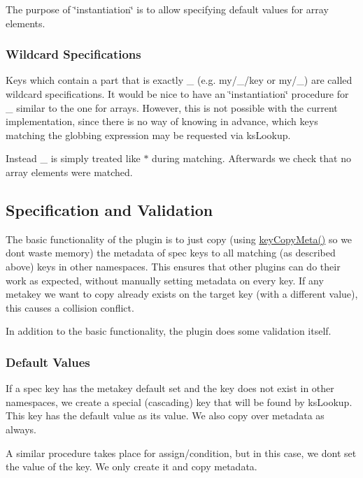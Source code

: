 The purpose of \char`\"{}instantiation\char`\"{} is to allow specifying {\ttfamily default} values for array elements.

\subsubsection*{Wildcard Specifications}

Keys which contain a part that is exactly {\ttfamily \+\_\+} (e.\+g. {\ttfamily my/\+\_\+/key} or {\ttfamily my/\+\_\+}) are called wildcard specifications. It would be nice to have an \char`\"{}instantiation\char`\"{} procedure for {\ttfamily \+\_\+} similar to the one for arrays. However, this is not possible with the current implementation, since there is no way of knowing in advance, which keys matching the globbing expression may be requested via {\ttfamily ks\+Lookup}.

Instead {\ttfamily \+\_\+} is simply treated like {\ttfamily $\ast$} during matching. Afterwards we check that no array elements were matched.

\subsection*{Specification and Validation}

The basic functionality of the plugin is to just copy (using {\ttfamily \hyperlink{group__keymeta_ga9a22b992478e613c8788bd460b4a1f0c}{key\+Copy\+Meta()}} so we don\textquotesingle{}t waste memory) the metadata of spec keys to all matching (as described above) keys in other namespaces. This ensures that other plugins can do their work as expected, without manually setting metadata on every key. If any metakey we want to copy already exists on the target key (with a different value), this causes a {\ttfamily collision} conflict.

In addition to the basic functionality, the plugin does some validation itself.

\subsubsection*{Default Values}

If a spec key has the metakey {\ttfamily default} set and the key does not exist in other namespaces, we create a special (cascading) key that will be found by {\ttfamily ks\+Lookup}. This key has the {\ttfamily default} value as its value. We also copy over metadata as always.

A similar procedure takes place for {\ttfamily assign/condition}, but in this case, we don\textquotesingle{}t set the value of the key. We only create it and copy metadata.

